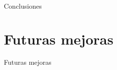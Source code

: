 \documentclass[../PFC.tex]{subfiles}
\begin{document}
Conclusiones

\section{Futuras mejoras}
\label{Futuras mejoras}

Futuras mejoras
\end{document}
